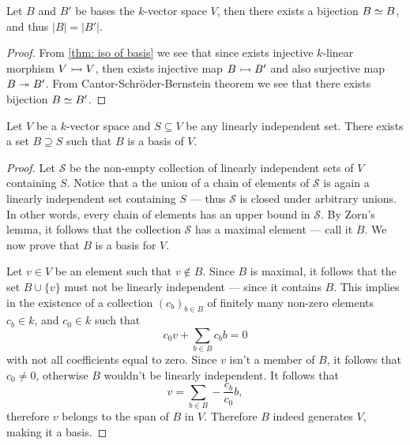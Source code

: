 \begin{lemma}\label{lem:basis-have-equal-cardinality}
    Let \(B\) and \(B'\) be bases the \(k\)-vector space \(V\), then there exists
    a bijection \(B \simeq B\), and thus \(|B| = |B'|\).
\end{lemma}

\begin{proof}
    From \cref{thm: iso of basis} we see that since exists injective
    \(k\)-linear morphism \(V \rightarrowtail V\), then exists injective map \(B
    \rightarrowtail B'\) and also surjective map \(B \twoheadrightarrow B'\). From
    Cantor-Schröder-Bernstein theorem we see that there exists bijection \(B \simeq
    B'\).
\end{proof}

\begin{proposition}\label{prop: li to basis}
    Let \(V\) be a \(k\)-vector space and \(S \subseteq V\) be any linearly
    independent set. There exists a set \(B \supseteq S\) such that \(B\) is a
    basis of \(V\).
\end{proposition}

\begin{proof}
    Let \(\mathcal{S}\) be the non-empty collection of linearly independent sets of
    \(V\) containing \(S\). Notice that a the union of a chain of elements of
    \(\mathcal{S}\) is again a linearly independent set containing \(S\) --- thus
    \(\mathcal{S}\) is closed under arbitrary unions. In other words, every chain of
    elements has an upper bound in \(\mathcal{S}\). By Zorn's lemma, it follows that
    the collection \(\mathcal{S}\) has a maximal element --- call it \(B\). We now
    prove that \(B\) is a basis for \(V\).

    Let \(v \in V\) be an element such that \(v \notin B\). Since \(B\) is maximal,
    it follows that the set \(B \cup \{v\}\) must not be linearly independent ---
    since it contains \(B\). This implies in the existence of a collection
    \((c_b)_{b \in B}\) of finitely many non-zero elements \(c_b \in k\), and \(c_0
    \in k\) such that
    \[
        c_0 v + \sum_{b \in B} c_b b = 0
    \]
    with not all coefficients equal to zero. Since \(v\) isn't a member of \(B\),
    it follows that \(c_0 \neq 0\), otherwise \(B\) wouldn't be linearly
    independent. It follows that
    \[
        v = \sum_{b \in B} - \frac{c_{b}}{c_{0}} b,
    \]
    therefore \(v\) belongs to the span of \(B\) in \(V\). Therefore \(B\) indeed
    generates \(V\), making it a basis.
\end{proof}

